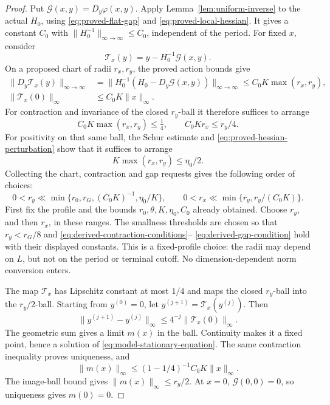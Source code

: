 \documentclass[11pt,reqno]{amsart}
\numberwithin{equation}{section}
\theoremstyle{definition}
\theoremstyle{remark}
\begin{document}
\begin{proof}
Put \(\mathcal G(x,y)=D_y\varphi(x,y)\). Apply
Lemma~\ref{lem:uniform-inverse} to the actual \(H_0\), using
\eqref{eq:proved-flat-gap} and \eqref{eq:proved-local-hessian}.
It gives a constant \(C_0\) with
\(\|H_0^{-1}\|_{\infty\to\infty}\le C_0\), independent of
the period. For fixed \(x\), consider
\begin{equation}
                         \mathcal T_x(y)=y-H_0^{-1}\mathcal G(x,y).
 \label{eq:model-contraction}
\end{equation}
On a proposed chart of radii \(r_x,r_y\), the proved action
bounds give
\begin{align*}
 \|D_y\mathcal T_x(y)\|_{\infty\to\infty}
   &=\|H_0^{-1}(H_0-D_y\mathcal G(x,y))\|_{\infty\to\infty}
       \le C_0K\max(r_x,r_y),\\
 \|\mathcal T_x(0)\|_\infty
   &\le C_0K\|x\|_\infty.
\end{align*}
For contraction and invariance of the closed \(r_y\)-ball it
therefore suffices to arrange
\begin{equation}
       C_0K\max(r_x,r_y)\le\tfrac14,
       \qquad C_0Kr_x\le r_y/4.
 \label{eq:derived-contraction-conditions}
\end{equation}
For positivity on that same ball, the Schur estimate and
\eqref{eq:proved-hessian-perturbation} show that it suffices to
arrange
\begin{equation}
                         K\max(r_x,r_y)\le\eta_0/2.
 \label{eq:derived-gap-condition}
\end{equation}
Collecting the chart, contraction and gap requests gives the
following order of choices:
\[
 0<r_y\ll\min\{r_0,r_G,(C_0K)^{-1},\eta_0/K\},
 \qquad
 0<r_x\ll\min\{r_y,r_y/(C_0K)\}.
\]
First fix the profile and the bounds \(r_0,\theta,K,\eta_0,C_0\)
already obtained. Choose \(r_y\), and then \(r_x\), in these
ranges. The smallness thresholds are chosen so that
\(r_y<r_G/8\) and
\eqref{eq:derived-contraction-conditions}--%
\eqref{eq:derived-gap-condition} hold with their displayed
constants. This is a fixed-profile choice: the radii may
depend on \(L\), but not on the period or terminal cutoff.
No dimension-dependent norm conversion enters.

The map \(\mathcal T_x\) has Lipschitz constant at most \(1/4\)
and maps the closed \(r_y\)-ball into the \(r_y/2\)-ball.
Starting from \(y^{(0)}=0\), let
\(y^{(j+1)}=\mathcal T_x(y^{(j)})\). Then
\[
       \|y^{(j+1)}-y^{(j)}\|_\infty
                    \le4^{-j}\|\mathcal T_x(0)\|_\infty.
\]
The geometric sum gives a limit \(m(x)\) in the ball.
Continuity makes it a fixed point, hence a solution of
\eqref{eq:model-stationary-equation}. The same contraction
inequality proves uniqueness, and
\[
       \|m(x)\|_\infty
            \le(1-1/4)^{-1}C_0K\|x\|_\infty.
\]
The image-ball bound gives
\(\|m(x)\|_\infty\le r_y/2\). At \(x=0\),
\(\mathcal G(0,0)=0\), so uniqueness gives \(m(0)=0\).


\end{proof}
\end{document}
